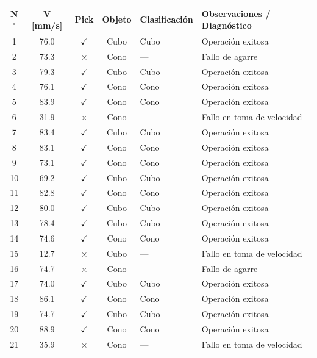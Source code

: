 \documentclass[12pt, a4paper]{report}
\begin{document}
\begin{table}[H]
\centering
\scriptsize
\begin{tabular}{|c|c|c|c|l|p{5.0cm}|}
\hline
\textbf{N$^\circ$} & \textbf{V [mm/s]} & \textbf{Pick} & \textbf{Objeto} & \textbf{Clasificación} & \textbf{Observaciones / Diagnóstico} \\ \hline
1  & 76.0  & $\checkmark$ & Cubo & Cubo & Operación exitosa \\ \hline
2  & 73.3  & $\times$     & Cono     & ---  & Fallo de agarre \\ \hline
3  & 79.3  & $\checkmark$ & Cubo & Cubo & Operación exitosa \\ \hline
4  & 76.1  & $\checkmark$ & Cono & Cono & Operación exitosa \\ \hline
5  & 83.9  & $\checkmark$ & Cono & Cono & Operación exitosa \\ \hline
6  & 31.9  & $\times$     & Cono     & ---  & Fallo en toma de velocidad \\ \hline
7  & 83.4  & $\checkmark$ & Cubo & Cubo & Operación exitosa \\ \hline
8  & 83.1  & $\checkmark$ & Cono & Cono & Operación exitosa \\ \hline
9  & 73.1  & $\checkmark$ & Cono & Cono & Operación exitosa \\ \hline
10 & 69.2  & $\checkmark$ & Cubo & Cubo & Operación exitosa \\ \hline
11 & 82.8  & $\checkmark$ & Cono & Cono & Operación exitosa \\ \hline
12 & 80.0  & $\checkmark$ & Cubo & Cubo & Operación exitosa \\ \hline
13 & 78.4  & $\checkmark$ & Cubo & Cubo & Operación exitosa \\ \hline
14 & 74.6  & $\checkmark$ & Cono & Cono & Operación exitosa \\ \hline
15 & 12.7  & $\times$     & Cubo     & ---  & Fallo en toma de velocidad \\ \hline
16 & 74.7  & $\times$     & Cono     & ---  & Fallo de agarre \\ \hline
17 & 74.0  & $\checkmark$ & Cubo & Cubo & Operación exitosa \\ \hline
18 & 86.1  & $\checkmark$ & Cono & Cono & Operación exitosa \\ \hline
19 & 74.7  & $\checkmark$ & Cubo & Cubo & Operación exitosa \\ \hline
20 & 88.9  & $\checkmark$ & Cono & Cono & Operación exitosa \\ \hline
21 & 35.9  & $\times$     & Cono     & ---  & Fallo en toma de velocidad \\ \hline

\end{tabular}
\end{table}
\end{document}
